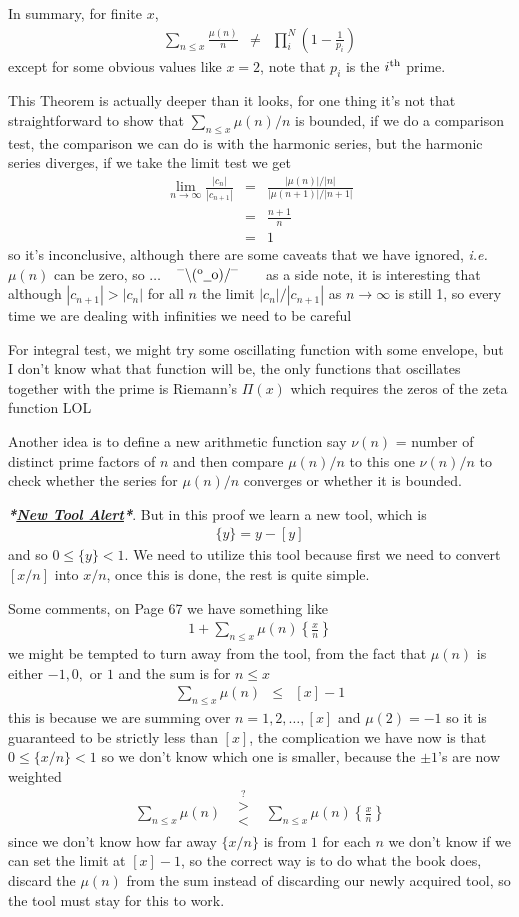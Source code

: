 \documentclass[aps,preprint,preprintnumbers,nofootinbib,showpacs,prd]{revtex4-1}
\newcommand{\ie}{{\it i.e.} }
\newcommand{\nbea}{\begin{eqnarray*}}
\newcommand{\neea}{\end{eqnarray*}}
\newcommand{\dunno}{$ {}^{\mbox {--}}\backslash(^{\rm o}{}\underline{\hspace{0.2cm}}{\rm o})/^{\mbox {--}}$}
\begin{document}
In summary, for finite $x$,
%
\nbea
\sum_{n\le x}\frac{\mu(n)}{n} & \neq & \prod_{i}^{N}\left(1-\frac{1}{p_i}\right)
\neea
%
except for some obvious values like $x=2$, note that $p_i$ is the $i^{\rm th}$ prime.

This Theorem is actually deeper than it looks, for one thing it's not that straightforward to show that $\sum_{n\le x}\mu(n)/n$ is bounded, if we do a comparison test, the comparison we can do is with the harmonic series, but the harmonic series diverges, if we take the limit test we get
%
\nbea
\lim_{n\to\infty} \frac{|c_n|}{|c_{n+1}|} & = & \frac{|\mu(n)|/|n|}{|\mu(n+1)|/|n+1|} \\
& = & \frac{n+1}{n} \\
& = & 1
\neea
%
so it's inconclusive, although there are some caveats that we have ignored, \ie $\mu(n)$ can be zero, so $\ldots$ ~ \dunno ~~~ as a side note, it is interesting that although $|c_{n+1}| > |c_n|$ for all $n$ the limit $|c_n|/|c_{n+1}|$ as $n\to\infty$ is still 1, so every time we are dealing with infinities we need to be careful

For integral test, we might try some oscillating function with some envelope, but I don't know what that function will be, the only functions that oscillates together with the prime is Riemann's $\Pi(x)$ which requires the zeros of the zeta function LOL

Another idea is to define a new arithmetic function say $\nu(n)$ =  number of distinct prime factors of $n$ and then compare $\mu(n)/n$ to this one $\nu(n)/n$ to check whether the series  for $\mu(n)/n$ converges or whether it is bounded.

\textbf{\textit{*}}\underline{\textit{\textbf{New Tool Alert}}}\textbf{\textit{*}}. But in this proof we learn a new tool, which is
%
\nbea
\{y\} = y - [y]
\neea
%
and so $0\le\{y\} < 1$. We need to utilize this tool because first we need to convert $[x/n]$ into $x/n$, once this is done, the rest is quite simple.

Some comments, on Page 67 we have something like
%
\nbea
1 + \sum_{n\le x}\mu(n)\left\{\frac{x}{n}\right\}
\neea
%
we might be tempted to turn away from the tool, from the fact that $\mu(n)$ is either $-1,0,$ or $1$ and the sum is for $n \le x$
%
\nbea
\sum_{n\le x}\mu(n) & \le & [x] - 1
\neea
%
this is because we are summing over $n=1,2,\ldots, [x]$ and $\mu(2) = -1$ so it is guaranteed to be strictly less than $[x]$, the complication we have now is that $0 \le \{x/n\} < 1$ so we don't know which one is smaller, because the $\pm1$'s are now weighted
%
\nbea
\sum_{n\le x}\mu(n) & \stackrel{?}{\substack{>\\<}} & \sum_{n\le x}\mu(n) \left\{\frac{x}{n} \right\}
\neea
%
since we don't know how far away $\{x/n\}$ is from $1$ for each $n$ we don't know if we can set the limit at $[x] - 1$, so the correct way is to do what the book does, discard the $\mu(n)$ from the sum instead of discarding our newly acquired tool, so the tool must stay for this to work.
\end{document}
